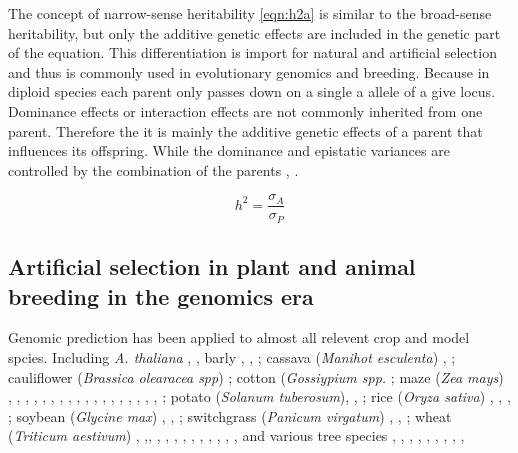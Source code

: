 The concept of narrow-sense heritability \ref{eqn:h2a} is similar to the broad-sense heritability, but only the additive genetic
effects are included in the genetic part of the equation. This differentiation is import for natural and artificial selection and
thus is commonly used in evolutionary genomics and breeding. Because in diploid species each parent only passes down on a single a
allele of a give locus. Dominance effects or interaction effects are not commonly inherited from one parent. Therefore the it is
mainly the additive genetic effects of a parent that influences its offspring. While the dominance and epistatic variances are
controlled by the combination of the parents \cite{falconer1996}, \cite{walsh2018}.


\begin{equation}
  h^2 = \frac{\sigma_{A}}{\sigma_{P}}
  \label{eqn:h2a}
\end{equation}



\subsection{Artificial selection in plant and animal breeding in the genomics era}

Genomic prediction has been applied to almost all relevent crop and model spcies. Including \textit{A. thaliana}
\cite{hu2015}, \cite{shen2013novel}, barly \cite{neyhart2019}, \cite{oakey2016} , \cite{zhong2009factors} ;
cassava (\textit{Manihot esculenta}) \cite{elias2018}, \cite{elias2018improving} ;
cauliflower (\textit{Brassica olearacea spp})   \cite{thorwarth2018genomic} ;
cotton (\textit{Gossiypium spp.}  \cite{gapare2018} ;
maze (\textit{Zea mays}) \cite{moeinizade2019} , \cite{allier2019usefulness} , \cite{brauner2018genomic},
\cite{schrag2018beyond}, \cite{schopp2017genomic}, \cite{e2017genomic}, \cite{schopp2017accuracy},
\cite{kadam2016genomic}, \cite{bustos2016improvement}, \cite{montesinos2015threshold}, \cite{owens2014foundation},
\cite{lehermeier2014usefulness},
\cite{technow2014genome}, \cite{peiffer2014genetic} , \cite{riedelsheimer2013genomic}, \cite{guo2013accuracy},
\cite{technow2013genomic}, \cite{windhausen2012} , \cite{rincent2012} ;
potato (\textit{Solanum tuberosum}),  \cite{enciso2018genomic}, \cite{Endelman2018pot} ;
rice (\textit{Oryza sativa}) \cite{Momen2019}, \cite{BenHassen2018}, \cite{Xu2013rice}, \cite{Grenier2015} ;
soybean (\textit{Glycine max}) \cite{Stewart_Brown_2019} , \cite{Jarquin_2016}, \cite{Xavier_2016} ; 
switchgrass (\textit{Panicum virgatum}) \cite{Poudel_2019}  ,\cite{Ramstein_2019} , \cite{Ramstein_2016} ;
wheat (\textit{Triticum aestivum}) \cite{Cuevas_2019} , \cite{Howard_2019} ,\cite{Krause_2019}, \cite{Rincent_2018},
\cite{Norman_2018}, \cite{Belamkar_2018}, \cite{Ovenden_2018}, \cite{Sukumaran_2016}, \cite{Bustos_Korts_2016},
\cite{Gianola_2016_wheat}, \cite{Crossa_2016_wheat}, \cite{Thavamanikumar_2015}, \cite{Lopez_Cruz_2015},
\cite{Rodriguez_2012}
and various tree species \cite{deAlmeidaFilho2019,}, \cite{Rincent_2018}, \cite{Kainer_2018}, \cite{Ratcliffe_2017},
\cite{GamalElDien_2016},
\cite{Kumar_2015}, \cite{Jaramillo_Correa_2014}, \cite{Zapata_Valenzuela_2013}, \cite{Holliday_2012}, \cite{Resende_2012}


